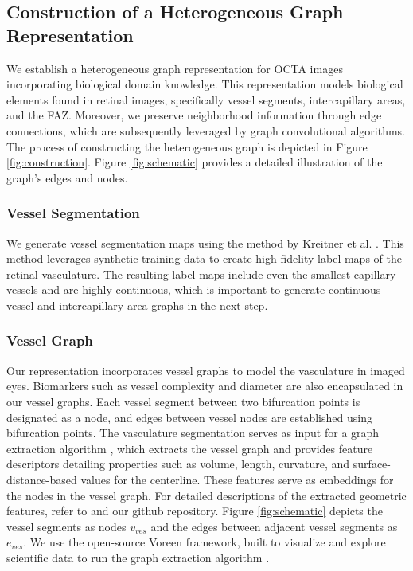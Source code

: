 \subsection{Construction of a Heterogeneous Graph Representation}

We establish a heterogeneous graph representation for OCTA images incorporating biological domain knowledge. This representation models biological elements found in retinal images, specifically vessel segments, intercapillary areas, and the FAZ. Moreover, we preserve neighborhood information through edge connections, which are subsequently leveraged by graph convolutional algorithms. The process of constructing the heterogeneous graph is depicted in Figure \ref{fig:construction}. Figure \ref{fig:schematic} provides a detailed illustration of the graph's edges and nodes.

\subsubsection{Vessel Segmentation}
We generate vessel segmentation maps using the method by Kreitner et al. \cite{kreitner2023detailed, menten2023synthetic}. This method leverages synthetic training data to create high-fidelity label maps of the retinal vasculature. The resulting label maps include even the smallest capillary vessels and are highly continuous, which is important to generate continuous vessel and intercapillary area graphs in the next step.

\subsubsection{Vessel Graph}
Our representation incorporates vessel graphs \cite{paetzold2023geometric, todorov2020machine} to model the vasculature in imaged eyes. Biomarkers such as vessel complexity and diameter are also encapsulated in our vessel graphs. Each vessel segment between two bifurcation points is designated as a node, and edges between vessel nodes are established using bifurcation points. The vasculature segmentation serves as input for a graph extraction algorithm \cite{drees2021scalable}, which extracts the vessel graph and provides feature descriptors detailing properties such as volume, length, curvature, and surface-distance-based values for the centerline. These features serve as embeddings for the nodes in the vessel graph. For detailed descriptions of the extracted geometric features, refer to \cite{drees2021scalable} and our github repository. Figure \ref{fig:schematic} depicts the vessel segments as nodes $v_{ves}$ and the edges between adjacent vessel segments as $e_{ves}$. We use the open-source Voreen framework, built to visualize and explore scientific data to run the graph extraction algorithm \cite{meyer2009voreen}.

